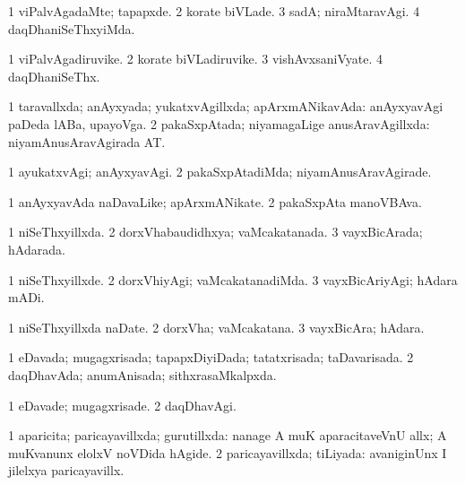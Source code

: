{\bentry
{} 
\gl{\kirxvi}
\expl{}
\bmng
\bnum
\num{1} viPalvAgadaMte; tapapxde. 
\num{2} korate biVLade. 
\num{3} sadA; niraMtaravAgi. 
\num{4} daqDhaniSeThxyiMda. 
\enum
\emng
\eentry

\bentry
{} 
\gl{\nA}
\expl{}
\bmng
\bnum
\num{1} viPalvAgadiruvike. 
\num{2} korate biVLadiruvike. 
\num{3} vishAvxsaniVyate. 
\num{4} daqDhaniSeThx. 
\enum
\emng
\eentry

\bentry
{} 
\gl{\gu}
\bmng
\bnum
\num{1} taravallxda; anAyxyada; yukatxvAgillxda; apArxmANikavAda:  anAyxyavAgi paDeda lABa, upayoVga. 
\num{2} pakaSxpAtada; niyamagaLige anusAravAgillxda:  niyamAnusAravAgirada AT. 
\enum
\emng
\eentry

\bentry
{} 
\gl{\kirxvi}
\expl{}
\bmng
\bnum
\num{1} ayukatxvAgi; anAyxyavAgi. 
\num{2} pakaSxpAtadiMda; niyamAnusAravAgirade. 
\enum
\emng
\eentry

\bentry
{} 
\gl{\nA}
\expl{}
\bmng
\bnum
\num{1} anAyxyavAda naDavaLike; apArxmANikate. 
\num{2} pakaSxpAta manoVBAva. 
\enum
\emng
\eentry

\bentry
{} 
\gl{\gu}
\expl{}
\bmng
\bnum
\num{1} niSeThxyillxda. 
\num{2} dorxVhabaudidhxya; vaMcakatanada. 
\num{3} vayxBicArada; hAdarada. 
\enum
\emng
\eentry

\bentry
{} 
\gl{\kirxvi}
\expl{}
\bmng
\bnum
\num{1} niSeThxyillxde. 
\num{2} dorxVhiyAgi; vaMcakatanadiMda. 
\num{3} vayxBicAriyAgi; hAdara mADi. 
\enum
\emng
\eentry

\bentry
{} 
\gl{\nA}
\expl{}
\bmng
\bnum
\num{1} niSeThxyillxda naDate. 
\num{2} dorxVha; vaMcakatana. 
\num{3} vayxBicAra; hAdara. 
\enum
\emng
\eentry

\bentry
{} 
\gl{\gu}
\expl{}
\bmng
\bnum
\num{1} eDavada; mugagxrisada; tapapxDiyiDada; tatatxrisada; taDavarisada. 
\num{2} daqDhavAda; anumAnisada; sithxrasaMkalpxda. 
\enum
\emng
\eentry

\bentry
{} 
\gl{\kirxvi}
\expl{}
\bmng
\bnum
\num{1} eDavade; mugagxrisade. 
\num{2} daqDhavAgi. 
\enum
\emng
\eentry

\bentry
{} 
\gl{\gu}
\expl{}
\bmng
\bnum
\num{1} aparicita; paricayavillxda; gurutillxda:  nanage A muK aparacitaveVnU allx; A muKvanunx elolxV noVDida hAgide. 
\num{2} paricayavillxda; tiLiyada:  avaniginUnx I jilelxya paricayavillx. 
\enum
\emng
\eentry

}
